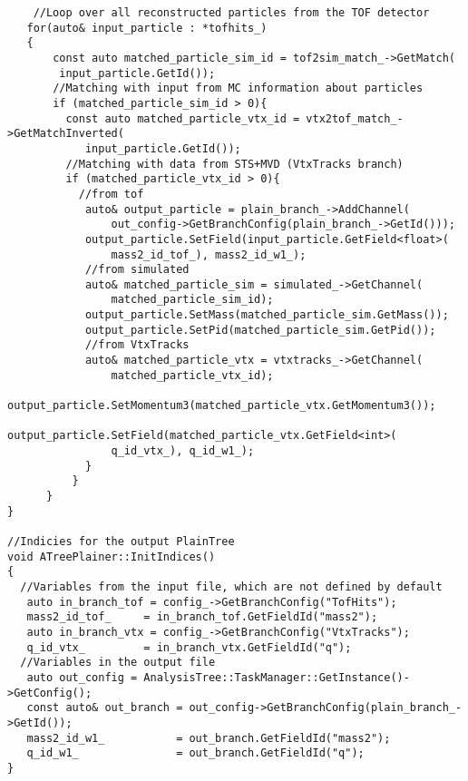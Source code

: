 \begin{lstlisting}
    //Loop over all reconstructed particles from the TOF detector
   for(auto& input_particle : *tofhits_)
   {
       const auto matched_particle_sim_id = tof2sim_match_->GetMatch(
        input_particle.GetId());
       //Matching with input from MC information about particles
       if (matched_particle_sim_id > 0){
         const auto matched_particle_vtx_id = vtx2tof_match_->GetMatchInverted(
            input_particle.GetId());
         //Matching with data from STS+MVD (VtxTracks branch)
         if (matched_particle_vtx_id > 0){
           //from tof
            auto& output_particle = plain_branch_->AddChannel(
                out_config->GetBranchConfig(plain_branch_->GetId()));
            output_particle.SetField(input_particle.GetField<float>(
                mass2_id_tof_), mass2_id_w1_);
            //from simulated
            auto& matched_particle_sim = simulated_->GetChannel(
                matched_particle_sim_id);
            output_particle.SetMass(matched_particle_sim.GetMass());
            output_particle.SetPid(matched_particle_sim.GetPid());
            //from VtxTracks
            auto& matched_particle_vtx = vtxtracks_->GetChannel(
                matched_particle_vtx_id);
            output_particle.SetMomentum3(matched_particle_vtx.GetMomentum3());
            output_particle.SetField(matched_particle_vtx.GetField<int>(
                q_id_vtx_), q_id_w1_);
            }
          }
      }
}

//Indicies for the output PlainTree
void ATreePlainer::InitIndices()
{
  //Variables from the input file, which are not defined by default
   auto in_branch_tof = config_->GetBranchConfig("TofHits");
   mass2_id_tof_     = in_branch_tof.GetFieldId("mass2");
   auto in_branch_vtx = config_->GetBranchConfig("VtxTracks");
   q_id_vtx_         = in_branch_vtx.GetFieldId("q");
  //Variables in the output file
   auto out_config = AnalysisTree::TaskManager::GetInstance()->GetConfig();
   const auto& out_branch = out_config->GetBranchConfig(plain_branch_->GetId());
   mass2_id_w1_           = out_branch.GetFieldId("mass2");
   q_id_w1_               = out_branch.GetFieldId("q");
}



\end{lstlisting}